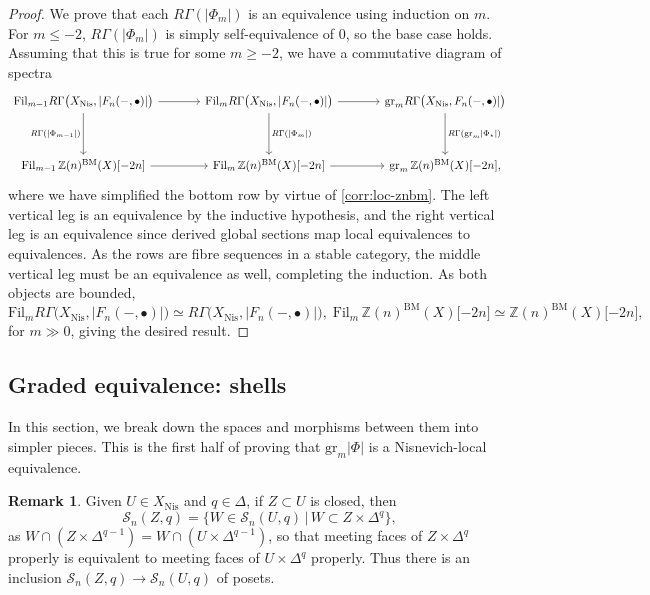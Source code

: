 \documentclass[11pt, twoside]{article}
\numberwithin{equation}{section}
\theoremstyle{definition}
\newtheorem{remark}[equation]{Remark}
\newcommand{\bb}[1]{\mathbb{#1}}
\newcommand{\fil}{\mathrm{Fil}}
\newcommand{\gr}{\mathrm{gr}}
\newcommand{\bm}{\mathrm{BM}}
\newcommand{\nis}{\mathrm{Nis}}
\begin{document}
\begin{proof}
We prove that each \(R\Gamma(|\Phi_m|)\) is an equivalence using induction on \(m\). For \(m \leq - 2\), \(R\Gamma(|\Phi_m|)\) is simply self-equivalence of \(0\), so the base case holds. Assuming that this is true for some \(m \geq - 2\), we have a commutative diagram of spectra
\[\begin{tikzcd} [row sep = huge, column sep = large]
\fil_{m - 1} R\Gamma\big(X_\nis, |F_n( -, \bullet)|\big) \ar[d, "R\Gamma(\lvert\Phi_{m - 1}\rvert)", swap] \ar[r] & \fil_m R\Gamma\big(X_\nis, |F_n( -, \bullet)|\big) \ar[d, "R\Gamma(\lvert\Phi_m\rvert)"] \ar[r] & \gr_m R\Gamma\big(X_\nis, F_n( -, \bullet)|\big) \ar[d, "R\Gamma(\gr_m \lvert\Phi_\star\rvert)"]\\
\fil_{m - 1} \, \bb{Z}(n)^\bm(X)\lbrack -2n \rbrack \ar[r] & \fil_m \, \bb{Z}(n)^\bm(X)\lbrack -2n \rbrack \ar[r] & \gr_m \, \bb{Z}(n)^\bm(X)\lbrack -2n \rbrack, \end{tikzcd}\]
where we have simplified the bottom row by virtue of \ref{corr:loc-znbm}.
The left vertical leg is an equivalence by the inductive hypothesis, and the right vertical leg is an equivalence since derived global sections map local equivalences to equivalences. As the rows are fibre sequences in a stable category, the middle vertical leg must be an equivalence as well, completing the induction. As both objects are bounded,
\[\fil_m R\Gamma\big(X_\nis, |F_n( -, \bullet)|\big) \simeq R\Gamma\big(X_\nis, |F_n( -, \bullet)|\big), \; \fil_m \, \bb{Z}(n)^\bm(X)\lbrack -2n \rbrack \simeq \bb{Z}(n)^\bm(X)\lbrack -2n \rbrack,\]
for \(m \gg 0\), giving the desired result.
\end{proof}


\subsection{Graded equivalence: shells}
In this section, we break down the spaces and morphisms between them into simpler pieces. This is the first half of proving that \(\gr_m |\Phi|\) is a Nisnevich-local equivalence. 

\begin{remark}\label{rem:cyc-in-closed}
Given \(U \in X_\nis\) and \(q \in \Delta\), if \(Z \subset U\) is closed, then 
\[\mathcal{S}_n(Z, q) = \{W \in \mathcal{S}_n(U, q) \, | \, W \subset Z \times \Delta^q\},\]
as \(W \cap (Z \times \Delta^{q - 1}) = W \cap (U \times \Delta^{q - 1})\), so that meeting faces of \(Z \times \Delta^q\) properly is equivalent to meeting faces of \(U \times \Delta^q\) properly. Thus there is an inclusion \(\mathcal{S}_n(Z, q) \to \mathcal{S}_n(U, q)\) of posets.
\end{remark}
\end{document}
